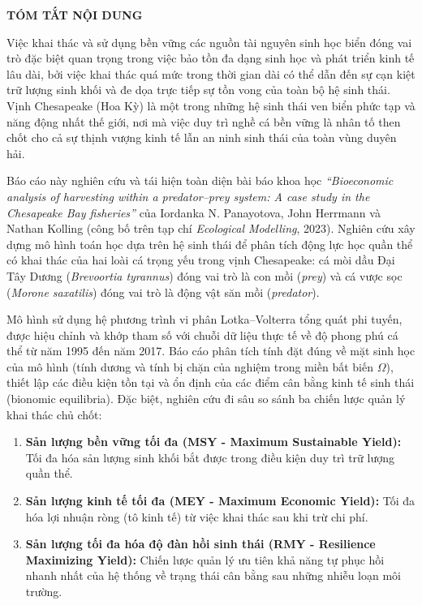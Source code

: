 \begin{center}
  {\Large \bfseries TÓM TẮT NỘI DUNG}
\end{center}
\vspace{0.5cm}

Việc khai thác và sử dụng bền vững các nguồn tài nguyên sinh học biển đóng vai trò đặc biệt quan trọng trong việc bảo tồn đa dạng sinh học và phát triển kinh tế lâu dài, bởi việc khai thác quá mức trong thời gian dài có thể dẫn đến sự cạn kiệt trữ lượng sinh khối và đe dọa trực tiếp sự tồn vong của toàn bộ hệ sinh thái. Vịnh Chesapeake (Hoa Kỳ) là một trong những hệ sinh thái ven biển phức tạp và năng động nhất thế giới, nơi mà việc duy trì nghề cá bền vững là nhân tố then chốt cho cả sự thịnh vượng kinh tế lẫn an ninh sinh thái của toàn vùng duyên hải.

Báo cáo này nghiên cứu và tái hiện toàn diện bài báo khoa học \textit{``Bioeconomic analysis of harvesting within a predator--prey system: A case study in the Chesapeake Bay fisheries''} của Iordanka N. Panayotova, John Herrmann và Nathan Kolling (công bố trên tạp chí \textit{Ecological Modelling}, 2023). Nghiên cứu xây dựng mô hình toán học dựa trên hệ sinh thái để phân tích động lực học quần thể có khai thác của hai loài cá trọng yếu trong vịnh Chesapeake: cá mòi dầu Đại Tây Dương (\textit{Brevoortia tyrannus}) đóng vai trò là con mồi (\textit{prey}) và cá vược sọc (\textit{Morone saxatilis}) đóng vai trò là động vật săn mồi (\textit{predator}).

Mô hình sử dụng hệ phương trình vi phân Lotka--Volterra tổng quát phi tuyến, được hiệu chỉnh và khớp tham số với chuỗi dữ liệu thực tế về độ phong phú cá thể từ năm 1995 đến năm 2017. Báo cáo phân tích tính đặt đúng về mặt sinh học của mô hình (tính dương và tính bị chặn của nghiệm trong miền bất biến $\Omega$), thiết lập các điều kiện tồn tại và ổn định của các điểm cân bằng kinh tế sinh thái (bionomic equilibria). Đặc biệt, nghiên cứu đi sâu so sánh ba chiến lược quản lý khai thác chủ chốt:
\begin{enumerate}
    \item \textbf{Sản lượng bền vững tối đa (MSY - Maximum Sustainable Yield):} Tối đa hóa sản lượng sinh khối bắt được trong điều kiện duy trì trữ lượng quần thể.
    \item \textbf{Sản lượng kinh tế tối đa (MEY - Maximum Economic Yield):} Tối đa hóa lợi nhuận ròng (tô kinh tế) từ việc khai thác sau khi trừ chi phí.
    \item \textbf{Sản lượng tối đa hóa độ đàn hồi sinh thái (RMY - Resilience Maximizing Yield):} Chiến lược quản lý ưu tiên khả năng tự phục hồi nhanh nhất của hệ thống về trạng thái cân bằng sau những nhiễu loạn môi trường.
\end{enumerate}

